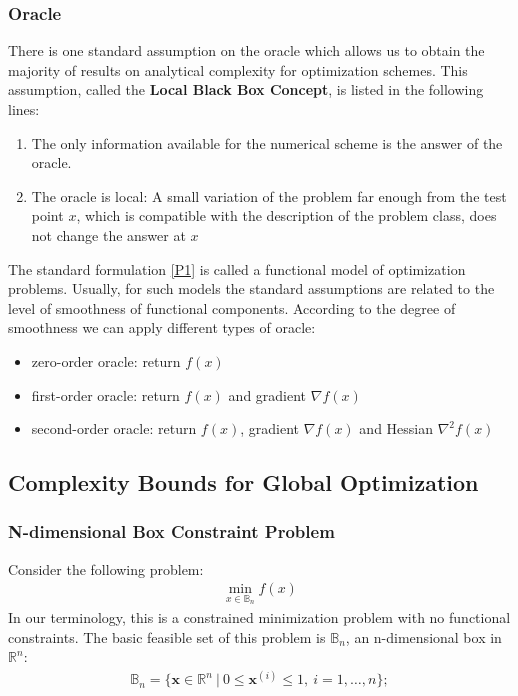 \subsubsection{Oracle}
There is one standard assumption on the oracle which allows us to obtain the majority of results on analytical complexity for optimization schemes. This assumption, called the \textbf{Local Black Box Concept}, is listed in the following lines:
\begin{enumerate}
    \item The only information available for the numerical scheme is the answer of the oracle.
    \item The oracle is local: A small variation of the problem far enough from the test point $x$, which is compatible with the description of the problem class, does not change the answer at $x$
\end{enumerate}

The standard formulation \ref{P1} is called a functional model of optimization problems. Usually, for such models the standard assumptions are related to the level of smoothness of functional components. According to the degree of smoothness we can apply different types of oracle:
\begin{itemize}
    \item zero-order oracle: return $f(x)$
    \item first-order oracle: return $f(x)$ and gradient $\nabla f(x)$
    \item second-order oracle: return $f(x)$, gradient $\nabla f(x)$ and Hessian $\nabla^2 f(x)$
\end{itemize}

\subsection{Complexity Bounds for Global Optimization}
\subsubsection{N-dimensional Box Constraint Problem}
Consider the following problem:
\begin{align}
    \min_{x\in \mathbb{B}_n}f(x) \label{P4}
\end{align}
In our terminology, this is a constrained minimization problem with no functional constraints. The basic feasible set of this problem is $\mathbb{B}_n$, an n-dimensional box in $\mathbb{R}^n$:
\begin{align*}
    \mathbb{B}_n=\{ \bm x\in \mathbb{R}^n\ |\ 0\le \bm x^{(i)}\le 1,\ i=1,\dots,n \} ;
\end{align*}

